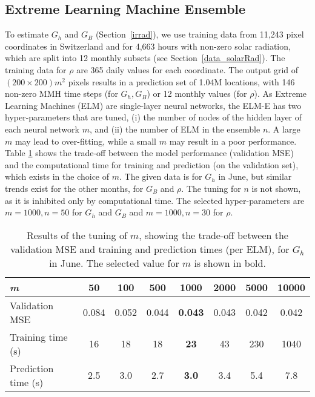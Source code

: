 \subsection*{Extreme Learning Machine Ensemble}
\label{app:tune_ELM}

To estimate $G_h$ and $G_B$ (Section~\ref{irrad}), we use training data from 11,243 pixel coordinates in Switzerland and for 4,663 hours with non-zero solar radiation, which are split into 12 monthly subsets (see Section~\ref{data_solarRad}).
The training data for $\rho$ are 365 daily values for each coordinate. 
The output grid of $(200 \times 200) m^2$ pixels results in a prediction set of 1.04M locations, with 146 non-zero MMH time steps (for $G_h, G_B$) or 12 monthly values (for $\rho$). 
%
As Extreme Learning Machines (ELM) are single-layer neural networks, the ELM-E has two hyper-parameters that are tuned, (i) the number of nodes of the hidden layer of each neural network $m$, and (ii) the number of ELM in the ensemble $n$. A large $m$ may lead to over-fitting, while a small $m$ may result in a poor performance. %
%
Table \ref{tab:ELM_tuning} shows the trade-off between the model performance (validation MSE) and the computational time for training and prediction (on the validation set), which exists in the choice of $m$. The given data is for $G_h$ in June, but similar trends exist for the other months, for $G_B$ and $\rho$. The tuning for $n$ is not shown, as it is inhibited only by computational time. The selected hyper-parameters are $m=1000, n=50$ for $G_h$ and $G_B$ and $m=1000, n=30$ for $\rho$.

\begin{table}[tb]
\centering
\footnotesize
\caption{Results of the tuning of $m$, showing the trade-off between the validation MSE and training and prediction times (per ELM), for $G_h$ in June. The selected value for $m$ is shown in bold.}
\label{tab:ELM_tuning}

    \begin{tabular}{lccccccc}
    \hline
    \textit{m}          & 50    & 100   & 500   & \textbf{1000}  & 2000  & 5000  & 10000 \\ \hline
    Validation MSE      & 0.084 & 0.052 & 0.044 & \textbf{0.043} & 0.043 & 0.042 & 0.042 \\
    Training time (s)   & 16    & 18    & 18    & \textbf{23}    & 43    & 230   & 1040  \\
    Prediction time (s) & 2.5   & 3.0   & 2.7   & \textbf{3.0}   & 3.4   & 5.4   & 7.8   \\ \hline
    \end{tabular}
\end{table}

